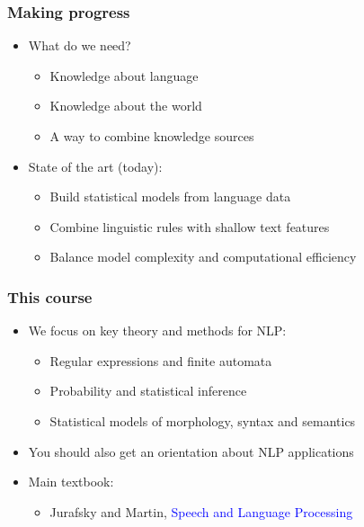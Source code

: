 \documentclass[dvipsnames]{beamer}
\begin{document}
\begin{frame}
\frametitle{Making progress}
\begin{itemize}
\item What do we need?
\begin{itemize}
\item Knowledge about language
\item Knowledge about the world
\item A way to combine knowledge sources
\end{itemize}
\item State of the art (today):
\begin{itemize}
\item Build statistical models from language data
\item Combine linguistic rules with shallow text features
\item Balance model complexity and computational efficiency
\end{itemize}
\end{itemize}
\end{frame}

\begin{frame}
\frametitle{This course}

\begin{itemize}
\item We focus on key theory and methods for NLP:
\begin{itemize}
\item Regular expressions and finite automata
\item Probability and statistical inference
\item Statistical models of morphology, syntax and semantics
\end{itemize}
\item You should also get an orientation about NLP applications
\item Main textbook: 
\begin{itemize}
\item Jurafsky and Martin, \textcolor{blue}{Speech and Language Processing}
\end{itemize}
\end{itemize}
\end{frame}
\end{document}

